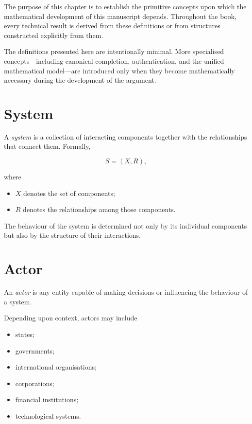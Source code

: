 \documentclass[11pt,openany]{book}
\theoremstyle{plain}
\theoremstyle{definition}
\begin{document}

The purpose of this chapter is to establish the primitive concepts upon which the mathematical development of this manuscript depends. Throughout the book, every technical result is derived from these definitions or from structures constructed explicitly from them.

The definitions presented here are intentionally minimal. More specialised concepts—including canonical completion, authentication, and the unified mathematical model—are introduced only when they become mathematically necessary during the development of the argument.


\section*{System}

A \emph{system} is a collection of interacting components together with the relationships that connect them. Formally,

\[
S=(X,R),
\]

where

\begin{itemize}
\item \(X\) denotes the set of components;
\item \(R\) denotes the relationships among those components.
\end{itemize}

The behaviour of the system is determined not only by its individual components but also by the structure of their interactions.


\section*{Actor}

An \emph{actor} is any entity capable of making decisions or influencing the behaviour of a system.

Depending upon context, actors may include

\begin{itemize}
\item states;
\item governments;
\item international organisations;
\item corporations;
\item financial institutions;
\item technological systems.
\end{itemize}
\end{document}
